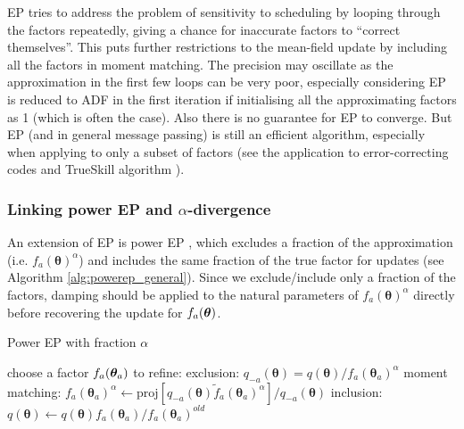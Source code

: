 EP tries to address the problem of sensitivity to scheduling by looping through the factors repeatedly, giving a chance for inaccurate factors to ``correct themselves''. This puts further restrictions to the mean-field update by including all the factors in moment matching. The precision may oscillate as the approximation in the first few loops can be very poor, especially considering EP is reduced to ADF in the first iteration if initialising all the approximating factors as 1 (which is often the case). Also there is no guarantee for EP to converge. But EP (and in general message passing) is still an efficient algorithm, especially when applying to only a subset of factors (see the application to error-correcting codes \citep{peterson:ecc1972} and TrueSkill algorithm \citep{herbrich:trueskill2006}). 

\subsubsection{Linking power EP and $\alpha$-divergence}
An extension of EP is power EP \citep{minka:powerep2004}, which excludes a fraction of the approximation (i.e. $f_a(\bm{\theta})^{\alpha}$) and includes the same fraction of the true factor for updates (see Algorithm \ref{alg:powerep_general}). Since we exclude/include only a fraction of the factors, damping should be applied to the natural parameters of $f_a(\bm{\theta})^{\alpha}$ directly before recovering the update for $f_a(\bm{\theta})$.

\begin{algorithm}[t] 
\caption{Power EP with fraction $\alpha$} 
\label{alg:powerep_general} 
\begin{algorithmic}[1] 
	\STATE choose a factor $f_a(\bm{\theta}_a)$ to refine:
	\STATE exclusion: $q_{-a}(\bm{\theta}) = q(\bm{\theta}) / f_a(\bm{\theta}_a)^{\alpha}$
	\STATE moment matching: $f_a(\bm{\theta}_a)^{\alpha} \leftarrow \mathrm{proj}[q_{-a}(\bm{\theta}) \tilde{f}_a(\bm{\theta}_a)^{\alpha}] / q_{-a}(\bm{\theta})$
	\STATE inclusion: $q(\bm{\theta}) \leftarrow q(\bm{\theta}) f_a(\bm{\theta}_a) / f_a(\bm{\theta}_a)^{old}$
\ENDWHILE
\end{algorithmic}
\end{algorithm}

